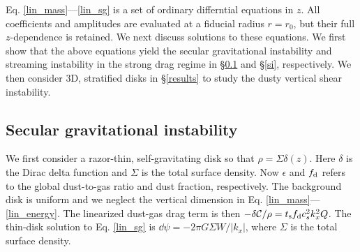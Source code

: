 
Eq. \ref{lin_mass}---\ref{lin_sg} is a set of ordinary
differntial equations in $z$. All coefficients and amplitudes are
evaluated at a fiducial radius $r=r_0$, but their full $z$-dependence
is retained. We next discuss solutions to these equations.  We first
show that the above equations yield the secular
gravitational instability and streaming instability in the strong
drag regime in \S\ref{sgi} and \S\ref{si}, respectively. We then
consider 3D, stratified disks in \S\ref{results} to study the dusty
vertical shear instability.

 


\subsection{Secular gravitational instability}\label{sgi}
We first consider a razor-thin, self-gravitating disk so that $\rho =
\Sigma\delta(z)$. Here $\delta$ is the Dirac delta function and $\Sigma$ is
the total surface density. Now $\epsilon$ and 
$f_\mathrm{d}$ refers to the global dust-to-gas ratio and dust 
fraction, respectively. The background disk is
uniform and we neglect the vertical dimension   
in Eq. \ref{lin_mass}---\ref{lin_energy}. The linearized dust-gas drag
term is then $-\delta\mathcal{C}/\rho = t_\mathrm{s}f_\mathrm{d} c_s^2k_x^2
Q$. The thin-disk solution to Eq. \ref{lin_sg} is $\dd\psi = -2\pi G
\Sigma W/\left|k_x\right|$, where $\Sigma$ is the total surface
density. 

